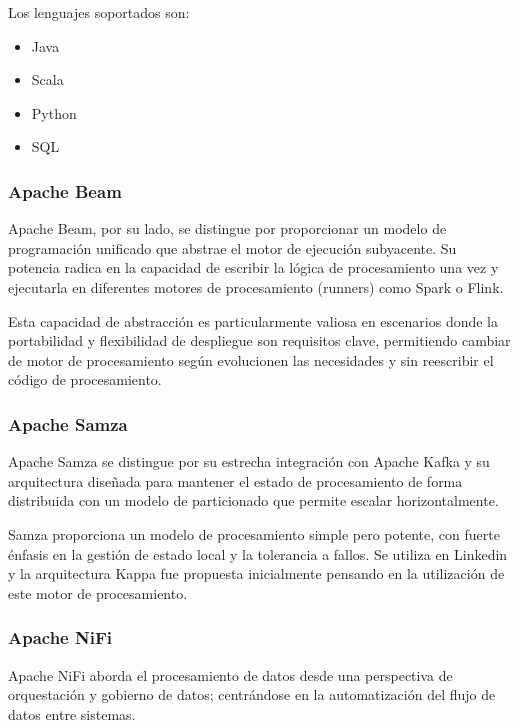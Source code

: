 Los lenguajes soportados son:

\begin{itemize}
    \item Java
    \item Scala
    \item Python
    \item SQL
\end{itemize}

\subsubsection{Apache Beam}

Apache Beam, por su lado, se distingue por proporcionar un modelo de programación unificado que abstrae el motor de ejecución subyacente.
Su potencia radica en la capacidad de escribir la lógica de procesamiento una vez y ejecutarla en 
diferentes motores de procesamiento (runners) como Spark o Flink.\newline

Esta capacidad de abstracción es particularmente valiosa en escenarios donde la portabilidad y flexibilidad de despliegue son requisitos clave, 
permitiendo cambiar de motor de procesamiento según evolucionen las necesidades y sin reescribir el código de procesamiento.

\subsubsection{Apache Samza}

Apache Samza se distingue por su estrecha integración con Apache Kafka y su arquitectura diseñada para mantener el estado 
de procesamiento de forma distribuida con un modelo de particionado que permite escalar horizontalmente.\newline

Samza proporciona un modelo de procesamiento simple pero potente, con fuerte énfasis en la gestión de estado local y la tolerancia a fallos.
Se utiliza en Linkedin y la arquitectura Kappa fue propuesta inicialmente pensando en la utilización de este motor de procesamiento.

\subsubsection{Apache NiFi}

Apache NiFi aborda el procesamiento de datos desde una perspectiva de orquestación y gobierno de datos; 
centrándose en la automatización del flujo de datos entre sistemas.\newline

